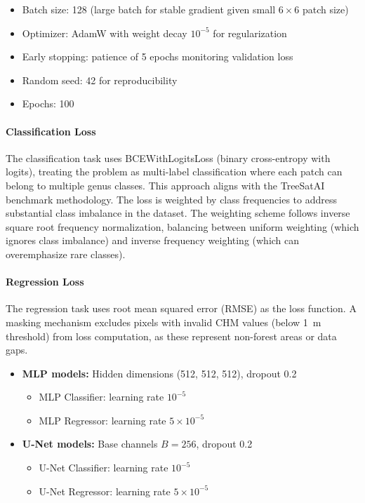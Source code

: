 \begin{itemize}
    \item Batch size: 128 (large batch for stable gradient given small $6\times 6$ patch size)
    \item Optimizer: AdamW with weight decay $10^{-5}$ for regularization
    \item Early stopping: patience of 5 epochs monitoring validation loss
    \item Random seed: 42 for reproducibility
    \item Epochs: 100
\end{itemize}

\paragraph{Classification Loss} The classification task uses BCEWithLogitsLoss (binary cross-entropy with logits), treating the problem as multi-label classification where each patch can belong to multiple genus classes. This approach aligns with the TreeSatAI benchmark methodology. The loss is weighted by class frequencies to address substantial class imbalance in the dataset. The weighting scheme follows inverse square root frequency normalization, balancing between uniform weighting (which ignores class imbalance) and inverse frequency weighting (which can overemphasize rare classes).

\paragraph{Regression Loss} The regression task uses root mean squared error (RMSE) as the loss function. A masking mechanism excludes pixels with invalid CHM values (below \SI{1}{\meter} threshold) from loss computation, as these represent non-forest areas or data gaps.

\begin{itemize}
    \item \textbf{MLP models:} Hidden dimensions (512, 512, 512), dropout 0.2
    \begin{itemize}
        \item MLP Classifier: learning rate $10^{-5}$
        \item MLP Regressor: learning rate $5\times 10^{-5}$
    \end{itemize}
    \item \textbf{U-Net models:} Base channels $B = 256$, dropout 0.2
    \begin{itemize}
        \item U-Net Classifier: learning rate $10^{-5}$
        \item U-Net Regressor: learning rate $5\times 10^{-5}$
    \end{itemize}
\end{itemize}

